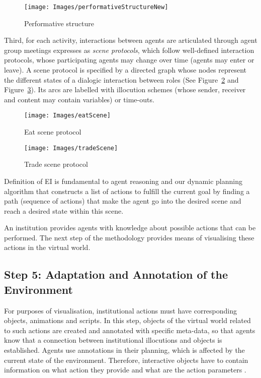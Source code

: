 \documentclass[graybox]{svmult}
\begin{document}
\begin{figure}[!ht]       
    \texttt{[image: Images/performativeStructureNew]}
    \caption{Performative structure}
    \label{fig:ps}
\end{figure}


Third, for each activity, interactions between agents are articulated through agent group meetings expresses as \textit{scene protocols}, which follow well-defined interaction protocols, whose participating agents may change over time (agents may enter or leave). A scene protocol is specified by a directed graph whose nodes represent the different states of a dialogic interaction between roles (See Figure~\ref{fig:eatScene} and Figure~\ref{fig:tradeScene}). Its arcs are labelled with illocution schemes (whose sender, receiver and content may contain variables) or time-outs.



\begin{figure}[t]
\sidecaption[t]
\texttt{[image: Images/eatScene]}
\caption{Eat scene protocol}
\label{fig:eatScene}       
\end{figure}


\begin{figure}[t]
\sidecaption[t]
\texttt{[image: Images/tradeScene]}
\caption{Trade scene protocol}
\label{fig:tradeScene}      
\end{figure}

Definition of EI is fundamental to agent reasoning and our dynamic planning algorithm that constructs a list of actions to fulfill the current goal by finding a path (sequence of actions) that make the agent go into the desired scene and reach a desired state within this scene.

An institution provides agents with knowledge about possible actions that can be performed. The next step of the methodology provides means of visualising these actions in the virtual world.


\subsection{Step 5: Adaptation and Annotation of the Environment}

\label{sec:adaptation}
  
For purposes of visualisation, institutional actions must have corresponding objects, animations and scripts. In this step, objects of the virtual world related to such actions are created and annotated with specific meta-data, so that agents know that a connection between institutional illocutions and objects is established. Agents use annotations in their planning, which is affected by the current state of the environment. Therefore, interactive objects have to contain information on what action they provide and what are the action parameters \cite{trescak_thesis}.
\end{document}
